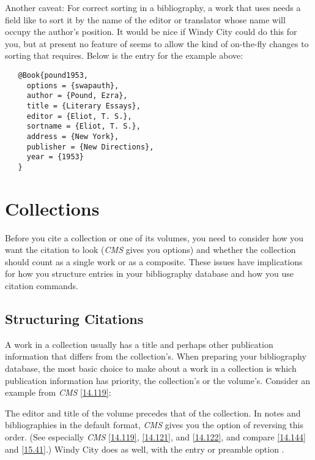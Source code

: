 \documentclass[11pt,letterpaper,oneside]{article}
\begin{document}
Another caveat: For correct sorting in a bibliography, a work that
uses  needs a field like  to sort it
by the name of the editor or translator whose name will occupy the
author's position. It would be nice if Windy City could do this for
you, but at present no feature of \biblatex seems to allow the kind of
on-the-fly changes to sorting that  requires. Below is
the entry for the example above:

\begin{verbatim}
   @Book{pound1953,
     options = {swapauth},
     author = {Pound, Ezra},
     title = {Literary Essays},
     editor = {Eliot, T. S.},
     sortname = {Eliot, T. S.},
     address = {New York},
     publisher = {New Directions},
     year = {1953}
   }
\end{verbatim}

\section{Collections}

Before you cite a collection or one of its volumes, you need to
consider how you want the citation to look (\textit{CMS} gives you
options) and whether the collection should count as a single work or
as a composite. These issues have implications for how you structure
entries in your bibliography database and how you use citation
commands.

\subsection{Structuring Citations}
\label{collorder}

A work in a collection usually has a title and perhaps other
publication information that differs from the collection's. When
preparing your bibliography database, the most basic choice to make
about a work in a collection is which publication information has
priority, the collection's or the volume's. Consider an example from
\textit{CMS} \ref{14.119}:

\begin{citebib}
\item \cite{armstrong2014}
\end{citebib}

\noindent The editor and title of the volume precedes that of the
collection. In notes and bibliographies in the default format,
\textit{CMS} gives you the option of reversing this order. (See
especially \textit{CMS} \ref{14.119}, \ref{14.121}, and \ref{14.122},
and compare \ref{14.144} and \ref{15.41}.) Windy City does as well,
with the entry or preamble option .
\end{document}
